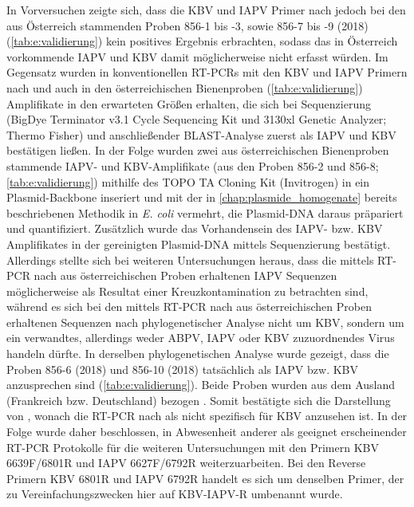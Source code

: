 In Vorversuchen zeigte sich, dass die KBV und IAPV Primer nach \citet{demiranda2010} jedoch bei den aus Österreich stammenden Proben 856-1 bis -3, sowie 856-7 bis -9 (2018) (\cref{tab:e:validierung}) kein positives Ergebnis erbrachten, sodass das in Österreich vorkommende IAPV und KBV damit möglicherweise nicht erfasst würden. Im Gegensatz wurden in konventionellen RT-PCRs mit den KBV und IAPV Primern nach \citet{stoltz1995} und \citet{maori2007} auch in den österreichischen Bienenproben (\cref{tab:e:validierung}) Amplifikate in den erwarteten Größen erhalten, die sich bei Sequenzierung (BigDye Terminator v3.1 Cycle Sequencing Kit und 3130xl Genetic Analyzer; Thermo Fisher) und anschließender BLAST-Analyse zuerst als IAPV und KBV bestätigen ließen. In der Folge wurden zwei aus österreichischen Bienenproben stammende IAPV- und KBV-Amplifikate (aus den Proben 856-2 und 856-8; \cref{tab:e:validierung}) mithilfe des TOPO TA Cloning\textsuperscript{\textregistered} Kit (Invitrogen) in ein Plasmid-Backbone inseriert und mit der in \cref{chap:plasmide_homogenate} bereits beschriebenen Methodik in \textit{E. coli} vermehrt, die Plasmid-DNA daraus präpariert und quantifiziert. Zusätzlich wurde das Vorhandensein des IAPV- bzw. KBV Amplifikates in der gereinigten Plasmid-DNA mittels Sequenzierung bestätigt. Allerdings stellte sich bei weiteren Untersuchungen heraus, dass die mittels RT-PCR nach \citet{maori2007} aus österreichischen Proben erhaltenen IAPV Sequenzen möglicherweise als Resultat einer Kreuzkontamination zu betrachten sind, während es sich bei den mittels RT-PCR nach \citet{stoltz1995} aus österreichischen Proben erhaltenen Sequenzen nach phylogenetischer Analyse nicht um KBV, sondern um ein verwandtes, allerdings weder ABPV, IAPV oder KBV zuzuordnendes Virus handeln dürfte. In derselben phylogenetischen Analyse wurde gezeigt, dass die Proben 856-6 (2018) und 856-10 (2018) tatsächlich als IAPV bzw. KBV anzusprechen sind (\cref{tab:e:validierung}). Beide Proben wurden aus dem Ausland (Frankreich bzw. Deutschland) bezogen \citep{siede2005,blanchard2008}. Somit bestätigte sich die Darstellung von \citet{demiranda2010}, wonach die RT-PCR nach \citet{stoltz1995} als nicht spezifisch für KBV anzusehen ist. In der Folge wurde daher beschlossen, in Abwesenheit anderer als geeignet erscheinender RT-PCR Protokolle für die weiteren Untersuchungen mit den Primern KBV 6639F/6801R und IAPV 6627F/6792R \citep{demiranda2010} weiterzuarbeiten. Bei den Reverse Primern KBV 6801R und IAPV 6792R handelt es sich um denselben Primer, der zu Vereinfachungszwecken hier auf KBV-IAPV-R umbenannt wurde.

